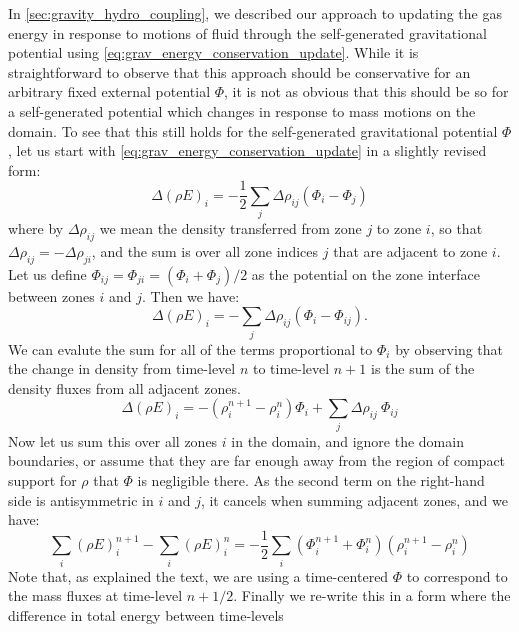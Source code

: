 \documentclass[12pt]{article}
\begin{document}
In \autoref{sec:gravity_hydro_coupling}, we described our approach to updating the gas energy
in response to motions of fluid through the self-generated gravitational potential using 
\autoref{eq:grav_energy_conservation_update}. While it is straightforward to observe that this approach
should be conservative for an arbitrary fixed external potential $\Phi$, it is not as obvious that this
should be so for a self-generated potential which changes in response to mass motions on the domain. To
see that this still holds for the self-generated gravitational potential $\Phi$, let us start with 
\autoref{eq:grav_energy_conservation_update} in a slightly revised form:
\begin{equation}
  \Delta(\rho E)_i = -\frac{1}{2}\sum_{j} \Delta\rho_{ij}(\Phi_i - \Phi_{j}) \label{eq:grav_energy_conservation_update_revised}
\end{equation}
where by $\Delta \rho_{ij}$ we mean the density transferred from zone $j$ to zone $i$, so that
$\Delta \rho_{ij} = - \Delta \rho_{ji}$, and the sum is over all zone indices $j$ that are adjacent
to zone $i$. Let us define $\Phi_{ij} = \Phi_{ji} = (\Phi_{i} + \Phi_{j}) / 2$ as the potential on the
zone interface between zones $i$ and $j$. Then we have:
\begin{equation}
  \Delta(\rho E)_i = -\sum_{j} \Delta\rho_{ij}(\Phi_i - \Phi_{ij}).
\end{equation}
We can evalute the sum for all of the terms proportional to $\Phi_i$ by observing that the change in
density from time-level $n$ to time-level $n+1$ is the sum of the density fluxes from all adjacent zones.
\begin{equation*}
  \Delta(\rho E)_i = - (\rho_i^{n+1} - \rho_i^{n}) \Phi_i + \sum_{j}\Delta \rho_{ij} \ \Phi_{ij}
\end{equation*}
Now let us sum this over all zones $i$ in the domain, and ignore the domain boundaries, or assume that they are
far enough away from the region of compact support for $\rho$ that $\Phi$ is negligible there. As the second
term on the right-hand side is antisymmetric in $i$ and $j$, it cancels when summing adjacent zones, and we have:
\begin{equation*}
  \sum_{i} (\rho E)_i^{n+1} - \sum_{i} (\rho E)_i^{n} = -\frac{1}{2}\sum_{i} (\Phi_{i}^{n+1} + \Phi_{i}^{n})(\rho_i^{n+1} - \rho_i^{n})
\end{equation*}
Note that, as explained the text, we are using a time-centered $\Phi$ to correspond to the mass fluxes
at time-level $n+1/2$. Finally we re-write this in a form where the difference in total energy between time-levels
\end{document}
